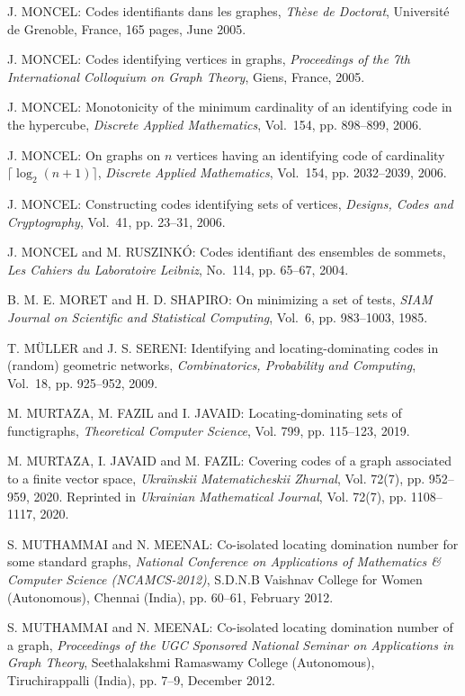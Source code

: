 \begin{thebibliography}{999}
J. MONCEL: Codes identifiants dans les graphes, {\it Th\`ese de Doctorat}, Universit\'e de Grenoble, France, 165 pages, June 2005.

J. MONCEL: Codes identifying vertices in graphs, {\it Proceedings of the 7th International Colloquium on Graph Theory}, Giens, France, 2005.

J. MONCEL: Monotonicity of the minimum cardinality of an identifying code in the hypercube, {\it Discrete Applied Mathematics}, Vol.~154, pp. 898--899, 2006.

J. MONCEL: On graphs on $n$ vertices having an identifying code of cardinality $\lceil \log_2 (n+1)\rceil$, {\it Discrete Applied Mathematics}, Vol.~154, pp. 2032--2039, 2006.

J. MONCEL: Constructing codes identifying sets of vertices, {\it Designs, Codes and Cryptography}, Vol.~41, pp. 23--31, 2006.

J. MONCEL and M. RUSZINK\'O: Codes identifiant des ensembles de sommets, {\it Les Cahiers du Laboratoire Leibniz}, No.~114, pp. 65--67, 2004.

B. M. E. MORET and H. D. SHAPIRO: On minimizing a set of tests, {\it SIAM Journal on Scientific and Statistical Computing}, Vol.~6, pp. 983--1003, 1985.

T. M\"{U}LLER and J. S. SERENI: Identifying and locating-dominating codes in (random) geometric networks, {\it Combinatorics, Probability and Computing}, Vol.~18, pp. 925--952, 2009.

M. MURTAZA, M. FAZIL and I. JAVAID: Locating-dominating sets of functigraphs, {\it Theoretical Computer Science}, Vol. 799, pp. 115--123, 2019.

M. MURTAZA, I. JAVAID and M. FAZIL: Covering codes of a graph associated to a finite vector space, {\it Ukra\"{i}nskii Matematicheskii Zhurnal}, Vol. 72(7), pp. 952--959, 2020. Reprinted in {\it Ukrainian Mathematical Journal}, Vol. 72(7), pp. 1108--1117, 2020.

S. MUTHAMMAI and N. MEENAL: Co-isolated locating domination number for  some  standard  graphs, {\it National Conference on  Applications of Mathematics \& Computer Science (NCAMCS-2012)}, S.D.N.B  Vaishnav College for Women (Autonomous), Chennai (India), pp.  60--61, February 2012.

S. MUTHAMMAI and N. MEENAL: Co-isolated locating domination number of a  graph, {\it Proceedings of the UGC Sponsored National Seminar on  Applications  in  Graph Theory}, Seethalakshmi  Ramaswamy  College (Autonomous), Tiruchirappalli (India), pp. 7--9, December 2012.


\end{thebibliography}

